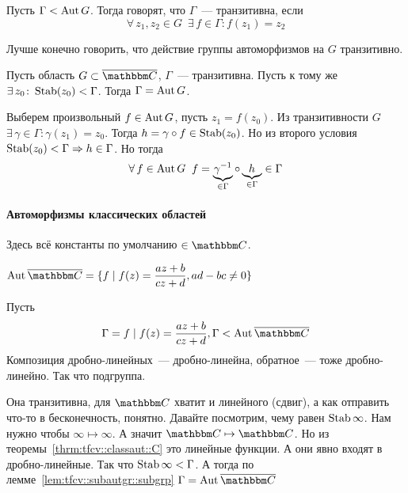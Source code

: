 \documentclass[12pt,timbord]{../../../notes}
\begin{document}
\begin{defn}\label{defn:tfcv::subautgr::trans}
  Пусть $\Gamma < \operatorname{Aut} G$. Тогда говорят, что $\Gamma$~--- транзитивна, если
  \[\forall\, z_1, z_2 \in G\;\: \exists\, f \in \Gamma\colon f(z_1) = z_2\]
\end{defn}
\begin{rem*}
  Лучше конечно говорить, что действие группы автоморфизмов на $G$ транзитивно.
\end{rem*}

\begin{lem}\label{lem:tfcv::subautgr::subgrp}
  Пусть область $G\subset \exC$, $\Gamma$~--- транзитивна. Пусть к тому же $\exists\, z_0 \colon
  \operatorname{Stab}(z_0) < \Gamma$. Тогда $\Gamma=\operatorname{Aut} G$.
\end{lem}
\begin{itlproof}
  Выберем произвольный $f \in \operatorname{Aut} G$, пусть $z_1 = f(z_0)$. Из транзитивности $G$ 
  $\exists\, \gamma\in \Gamma\colon \gamma(z_1) = z_0$. Тогда $h = \gamma\circ f\in \operatorname{Stab} (z_0)$.
  Но из второго условия $\operatorname{Stab} (z_0) < \Gamma \Rightarrow h \in \Gamma$. Но тогда 
  \[
    \forall\, f\in \operatorname{Aut} G  \;\;f = \underbrace{\gamma^{-1}}_{\in \Gamma} \circ \underbrace{h}_{\in
    \Gamma} \in \Gamma
  \]
\end{itlproof}

\paragraph{Автоморфизмы классических областей}
\label{par:tfcv::classaut}
Здесь всё константы по умолчанию $\in \C$.
\begin{thrm}\label{thrm:tfcv::classaut::exC}
  $\displaystyle \Aut \exC  = \{f \mid f(z) = \frac{az+b}{cz+d}, ad-bc \neq 0\}$
\end{thrm}
\begin{ittproof}
  Пусть \[
    \Gamma = {f\mid f(z) = \frac{{a z + b}}{cz+d}}, \Gamma < \Aut \exC
  \]
  Композиция дробно-линейных~--- дробно-линейна, обратное~--- тоже дробно-линейно. Так что
  подгруппа. 

  Она транзитивна, для $\C$ хватит и линейного (сдвиг), а как отправить что-то в бесконечность, понятно.
  Давайте посмотрим, чему равен $\operatorname{Stab} \infty$. Нам нужно чтобы $\infty \mapsto \infty$. А значит
  $\C \mapsto \C$. Но из теоремы~\ref{thrm:tfcv::classaut::C} это линейные функции. А они явно
  входят в дробно-линейные. Так что $\operatorname{Stab} \infty < \Gamma$. А тогда по
  лемме~\ref{lem:tfcv::subautgr::subgrp} $\Gamma = \Aut \exC$
\end{ittproof}
\end{document}
